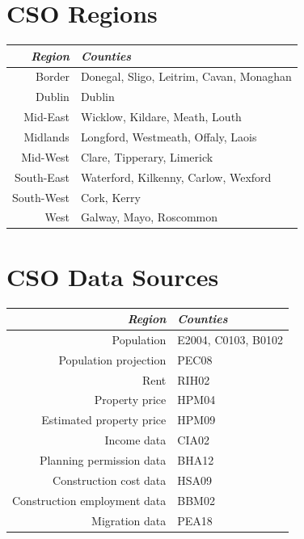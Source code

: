 \documentclass[twocolumn]{article}
\begin{document}
\begin{appendices}
\section{CSO Regions\label{a:regions}}
\begin{tabularx}{0.5\textwidth}{r X}
    \textit{Region} & \textit{Counties} \\ \hline
    Border & Donegal, Sligo, Leitrim, Cavan, Monaghan\\ \hline
    Dublin & Dublin\\ \hline
    Mid-East & Wicklow, Kildare, Meath, Louth\\ \hline
    Midlands & Longford, Westmeath, Offaly, Laois\\ \hline
    Mid-West & Clare, Tipperary, Limerick\\ \hline
    South-East & Waterford, Kilkenny, Carlow, Wexford\\ \hline
    South-West & Cork, Kerry\\ \hline
    West & Galway, Mayo, Roscommon
\end{tabularx}
\section{CSO Data Sources\label{a:sources}}
\begin{tabularx}{0.5\textwidth}{r X}
    \textit{Region} & \textit{Counties} \\ \hline
    Population & E2004, C0103, B0102 \\ \hline
    Population projection & PEC08 \\ \hline
    Rent & RIH02 \\ \hline
    Property price & HPM04  \\ \hline
    Estimated property price & HPM09 \\ \hline
    Income data & CIA02 \\ \hline
    Planning permission data & BHA12 \\ \hline
    Construction cost data & HSA09 \\ \hline
    Construction employment data & BBM02 \\ \hline
    Migration data & PEA18
\end{tabularx}
\end{appendices}
\end{document}
